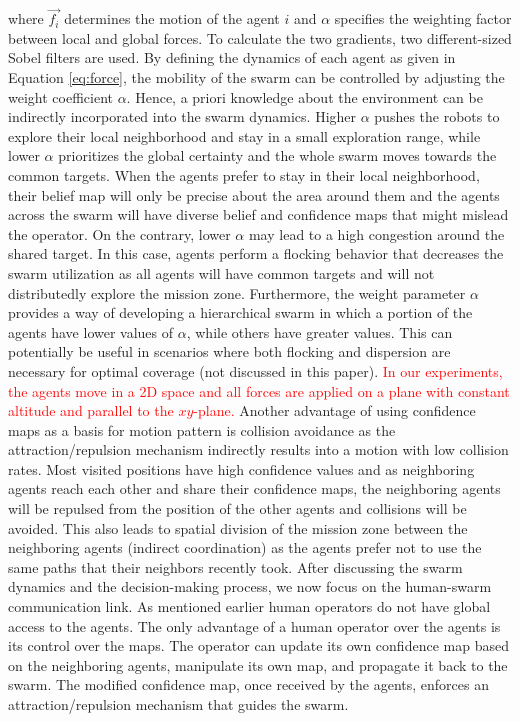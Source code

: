 \documentclass[runningheads]{llncs}%
\begin{document}
where $\overrightarrow{f_i}$ determines the motion of the agent {$i$} and $\alpha$ specifies the weighting factor between local and global forces. To calculate the two gradients, two different-sized Sobel filters are used. By defining the dynamics of each agent as given in Equation \ref{eq:force}, the mobility of the swarm can be controlled by adjusting the weight coefficient $\alpha$. Hence, a priori knowledge about the environment can be indirectly incorporated into the swarm dynamics. Higher $\alpha$ pushes the robots to explore their local neighborhood and stay in a small exploration range, while lower $\alpha$ prioritizes the global certainty and the whole swarm moves towards the common targets. When the agents prefer to stay in their local neighborhood, their belief map will only be precise about the area around them and the agents across the swarm will have diverse belief and confidence maps that might mislead the operator. On the contrary, lower $\alpha$ may lead to a high congestion around the shared target. In this case, agents perform a flocking behavior that decreases the swarm utilization as all agents will have common targets and will not distributedly explore the mission zone. Furthermore, the weight parameter $\alpha$ provides a way of developing a hierarchical swarm in which a portion of the agents have lower values of $\alpha$, while others have greater values. This can potentially be useful in scenarios where both flocking and dispersion are necessary for optimal coverage (not discussed in this paper).  
\textcolor{red}{In our experiments, the agents move in a 2D space and all forces are applied on a plane with constant altitude and parallel to the $xy$-plane.}
{Another advantage of using confidence maps as a basis for motion pattern is collision avoidance as the attraction/repulsion mechanism indirectly results into a motion with low collision rates. Most visited positions have high confidence values and as neighboring agents reach each other and share their confidence maps, the neighboring agents will be repulsed from the position of the other agents and collisions will be avoided. This also leads to spatial division of the mission zone between the neighboring agents (indirect coordination) as the agents prefer not to use the same paths that their neighbors recently took.} After discussing the swarm dynamics and the decision-making process, we now focus on the human-swarm communication link. As mentioned earlier human operators do not have global access to the agents. The only advantage of a human operator over the agents is its control over the maps. The operator can update its own confidence map based on the neighboring agents, manipulate its own map, and propagate it back to the swarm. The modified confidence map, once received by the agents, enforces an attraction/repulsion mechanism that guides the swarm. 
\end{document}
